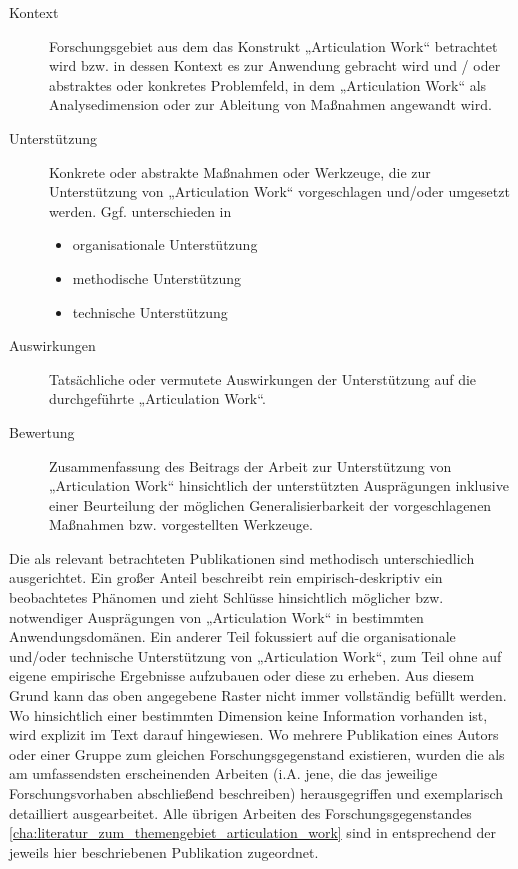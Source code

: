 \begin{description}
	\item[Kontext] Forschungsgebiet aus dem das Konstrukt „Articulation Work“ betrachtet wird bzw. in dessen Kontext es zur Anwendung gebracht wird und / oder abstraktes oder konkretes Problemfeld, in dem „Articulation Work“ als Analysedimension oder zur Ableitung von Maßnahmen angewandt wird.
	\item[Unterstützung] Konkrete oder abstrakte Maßnahmen oder Werkzeuge, die zur Unterstützung von „Articulation Work“ vorgeschlagen und/oder umgesetzt werden. Ggf. unterschieden in
	\begin{itemize}
		\item organisationale Unterstützung
		\item methodische Unterstützung
		\item technische Unterstützung
	\end{itemize}
	\item[Auswirkungen] Tatsächliche oder vermutete Auswirkungen der Unterstützung auf die durchgeführte „Articulation Work“.
	\item[Bewertung] Zusammenfassung des Beitrags der Arbeit zur Unterstützung von „Articulation Work“ hinsichtlich der unterstützten Ausprägungen inklusive einer Beurteilung der möglichen Generalisierbarkeit der vorgeschlagenen Maßnahmen bzw. vorgestellten Werkzeuge.
\end{description}

Die als relevant betrachteten Publikationen sind methodisch unterschiedlich ausgerichtet. Ein großer Anteil beschreibt rein empirisch-deskriptiv ein beobachtetes Phänomen und zieht Schlüsse hinsichtlich möglicher bzw. notwendiger Ausprägungen von „Articulation Work“ in bestimmten Anwendungsdomänen. Ein anderer Teil fokussiert auf die organisationale und/oder technische Unterstützung von „Articulation Work“, zum Teil ohne auf eigene empirische Ergebnisse aufzubauen oder diese zu erheben. Aus diesem Grund kann das oben angegebene Raster nicht immer vollständig befüllt werden. Wo hinsichtlich einer bestimmten Dimension keine Information vorhanden ist, wird explizit im Text darauf hingewiesen. Wo mehrere Publikation eines Autors oder einer Gruppe zum gleichen Forschungsgegenstand existieren, wurden die als am umfassendsten erscheinenden Arbeiten (i.A. jene, die das jeweilige Forschungsvorhaben abschließend beschreiben) herausgegriffen und exemplarisch detailliert ausgearbeitet. Alle übrigen Arbeiten des Forschungsgegenstandes \ref{cha:literatur_zum_themengebiet_articulation_work} sind in entsprechend der jeweils hier beschriebenen Publikation zugeordnet.


